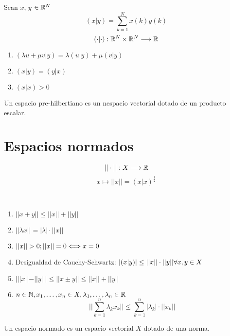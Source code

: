     \begin{definicion}
        Sean $x$, $y$ $\in \mathbb R^N$
        $$(x|y) = \sum_{k=1}^N x(k)y(k)$$
        $$(\cdot|\cdot):\mathbb R^N\times \mathbb R^N \longrightarrow\mathbb R$$
    \end{definicion}
    
        \begin{enumerate}
            \item $(\lambda u + \mu v|y) = \lambda(u|y) + \mu (v|y)$
            \item $(x|y) = (y|x) $
            \item $(x|x) > 0$
        \end{enumerate}
    Un espacio pre-hilbertiano es un nespacio vectorial dotado de un producto escalar.
        

\section{Espacios normados}
    \begin{definicion}[Norma]
        $$||\cdot||: X \longrightarrow\mathbb R$$
        $$x \longmapsto ||x|| = (x|x)^{\frac{1}{2}}$$   
    \end{definicion}
    \begin{propiedades} []\\
        \begin{enumerate}
            \item $||x+y|| \leq||x||+||y||$
            \item $||\lambda x|| = |\lambda | \cdot||x||$
            \item $||x|| > 0;\\ ||x|| = 0 \Longleftrightarrow x = 0$
            \item Desigualdad de Cauchy-Schwartz:
            $|(x|y)| \leq ||x||\cdot ||y|| \\ \forall x, y\in X$
            \item $|||x||-||y||| \leq ||x\pm y|| \leq ||x|| + ||y||$
            \item $n\in \mathbb N, \\ x_1, \ldots , x_n\in X, \\ \lambda_1, \ldots, \lambda_n\in \mathbb R$ \newline
            $$||\sum_{k=1}^n \lambda_k x_k|| \leq \sum_{k=1}^n |\lambda_k|\cdot||x_k||$$
        \end{enumerate}
    \end{propiedades}
    Un espacio normado es un espacio vectorial $X$ dotado de una norma.
    \newline
    
